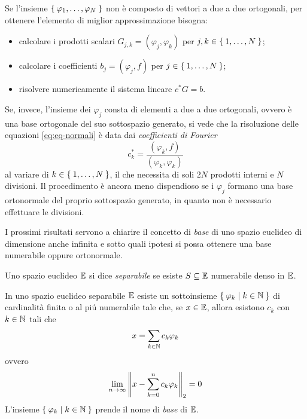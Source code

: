 	\begin{osservazione}
		Se l'insieme \(\Set{\varphi_1, \dots, \varphi_N}\) non è composto di vettori a due a due ortogonali, per ottenere l'elemento di miglior approssimazione bisogna:
		\begin{itemize}
			\item calcolare i prodotti scalari \(G_{j, k} = (\varphi_j, \varphi_k)\) per \(j, k \in \Set{1, \dots, N}\);
			\item calcolare i coefficienti \(b_j = (\varphi_j, f)\) per \(j \in \Set{1, \dots, N}\);
			\item risolvere numericamente il sistema lineare \(c^* G = b\).
		\end{itemize}
		Se, invece, l'insieme dei \(\varphi_j\) consta di elementi a due a due ortogonali, ovvero è una base ortogonale del suo sottospazio generato, si vede che la risoluzione delle equazioni \eqref{eq:eq-normali} è data dai \emph{coefficienti di Fourier}
		\begin{equation}\label{eq:coeff-fourier}
			c_k^* = \frac{(\varphi_k, f)}{(\varphi_k, \varphi_k)}
		\end{equation}
		al variare di \(k \in \Set{1, \dots, N}\), il che necessita di soli \(2 N\) prodotti interni e \(N\) divisioni. Il procedimento è ancora meno dispendioso se i \(\varphi_j\) formano una base ortonormale del proprio sottospazio generato, in quanto non è necessario effettuare le divisioni.
	\end{osservazione}

	I prossimi risultati servono a chiarire il concetto di \emph{base} di uno spazio euclideo di dimensione anche infinita e sotto quali ipotesi si possa ottenere una base numerabile oppure ortonormale.
	
	\begin{definizione}
		Uno spazio euclideo \(\mathbb{E}\) si dice \emph{separabile} se esiste \(S \subseteq \mathbb{E}\) numerabile denso in \(\mathbb{E}\).
	\end{definizione}

	\begin{teorema}\label{th:base-sp-euclideo-separabile}
		In uno spazio euclideo separabile \(\mathbb{E}\) esiste un sottoinsieme \(\Set{\varphi_k | k \in \mathbb{N}}\) di cardinalità finita o al piú numerabile tale che, se \(x \in \mathbb{E}\), allora esistono \(c_k\) con \(k \in \mathbb{N}\) tali che
		\begin{equation*}
			x = \sum_{k \in \mathbb{N}} c_k \varphi_k
		\end{equation*}
		ovvero
		\begin{equation*}
			\lim_{n \to \infty} \norm{x - \sum_{k = 0}^n c_k \varphi_k}_2 = 0
		\end{equation*}
		L'insieme \(\Set{\varphi_k | k \in \mathbb{N}}\) prende il nome di \emph{base} di \(\mathbb{E}\).
	\end{teorema}

